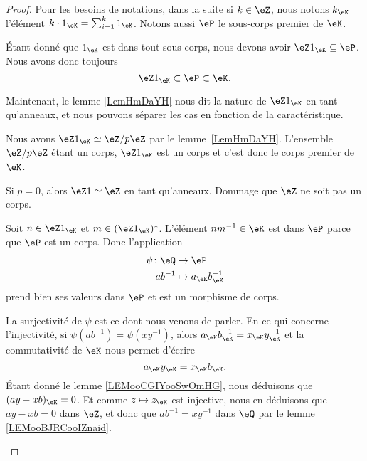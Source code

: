\begin{proof}
	Pour les besoins de notations, dans la suite si \( k\in \eZ\), nous notons \( k_{\eK}\) l'élément \( k\cdot 1_{\eK}=\sum_{i=1}^k1_{\eK}\). Notons aussi \( \eP\) le sous-corps premier de \( \eK\).

	Étant donné que \( 1_{\eK}\) est dans tout sous-corps, nous devons avoir \( \eZ 1_{\eK}\subseteq \eP\). Nous avons donc toujours
	\begin{equation}
		\eZ 1_{\eK}\subset \eP\subset \eK.
	\end{equation}

	Maintenant, le lemme \ref{LemHmDaYH} nous dit la nature de \( \eZ 1_{\eK}\) en tant qu'anneaux, et nous pouvons séparer les cas en fonction de la caractéristique.
	\begin{subproof}
		\spitem[Si \( p>0\)]
		Nous avons \( \eZ 1_{\eK}\simeq\eZ/p\eZ\) par le lemme~\ref{LemHmDaYH}. L'ensemble \( \eZ/p\eZ\) étant un corps, \( \eZ 1_{\eK} \) est un corps et c'est donc le corps premier de \( \eK\).

		\spitem[Si \( p=0\)]
		Si \( p=0\), alors \( \eZ 1\simeq \eZ\) en tant qu'anneaux. Dommage que \( \eZ\) ne soit pas un corps.

		Soit \( n\in \eZ 1_{\eK}\) et \( m\in (\eZ 1_{\eK})^*\). L'élément \( nm^{-1}\in \eK\) est dans \( \eP\) parce que \( \eP\) est un corps. Donc l'application
		\begin{equation}
			\begin{aligned}
				\psi\colon \eQ & \to \eP                     \\
				ab^{-1}        & \mapsto a_{\eK}b_{\eK}^{-1}
			\end{aligned}
		\end{equation}
		prend bien ses valeurs dans \( \eP\) et est un morphisme de corps.

		La surjectivité de \( \psi\) est ce dont nous venons de parler. En ce qui concerne l'injectivité, si \( \psi(ab^{-1})=\psi(xy^{-1})\), alors \( a_{\eK}b_{\eK}^{-1}=x_{\eK}y_{\eK}^{-1}\) et la commutativité de \( \eK\) nous permet d'écrire
		\begin{equation}
			a_{\eK}y_{\eK}=x_{\eK}b_{\eK}.
		\end{equation}
		Étant donné le lemme \ref{LEMooCGIYooSwOmHG}, nous déduisons que \( (ay-xb)_{\eK}=0\). Et comme \( z\mapsto z_{\eK}\) est injective, nous en déduisons que \( ay-xb=0\) dans \( \eZ\), et donc que \( ab^{-1}=xy^{-1}\) dans \( \eQ\) par le lemme \ref{LEMooBJRCooIZnaid}.
	\end{subproof}
\end{proof}

